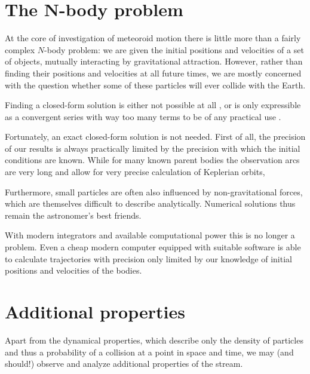 


\section{The N-body problem} \label{mN}
    At the core of investigation of meteoroid motion there is little more than a fairly complex $N$-body problem:
    we are given the initial positions and velocities of a set of objects, mutually interacting by gravitational attraction.
    However, rather than finding their positions and velocities at all future times, we are mostly concerned
    with the question whether some of these particles will ever collide with the Earth.

    Finding a closed-form solution is either not possible at all \cite{...}, or is only expressible
    as a convergent series with way too many terms to be of any practical use \citep{beloriszky-1930}.

    Fortunately, an exact closed-form solution is not needed. First of all, the precision of our results
    is always practically limited by the precision with which the initial conditions are known.
    While for many known parent bodies the observation arcs are very long and allow for very precise
    calculation of Keplerian orbits,

    Furthermore, small particles are often also influenced by non-gravitational forces,
    which are themselves difficult to describe analytically.
    Numerical solutions thus remain the astronomer's best friends.

    With modern integrators and available computational power this is no longer a problem.
    Even a cheap modern computer equipped with suitable software is able to calculate trajectories
    with precision only limited by our knowledge of initial positions and velocities of the bodies.

\section{Additional properties} \label{ma}
    Apart from the dynamical properties, which describe only the density of particles
    and thus a probability of a collision at a point in space and time,
    we may (and should!) observe and analyze additional properties of the stream.

